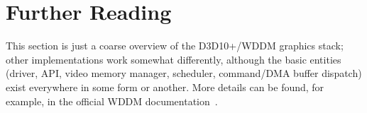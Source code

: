 \section{Further Reading}

This section is just a coarse overview of the D3D10+/WDDM graphics stack; other 
implementations work somewhat differently, although the basic entities (driver, 
API, video memory manager, scheduler, command/DMA buffer dispatch) exist 
everywhere in some form or another. More details can be found, for example, in 
the official WDDM documentation~\citep{wddm}.

{}
